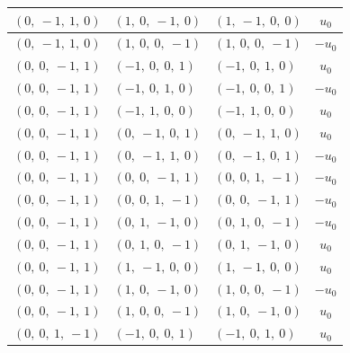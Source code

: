 \documentclass[11pt]{article}
\theoremstyle{definition}
\begin{document}
\begin{longtable}{|l|l|l|c|}
    \hline
    $\left( 0, \  -1, \  1, \  0\right)$ & $\left( 1, \  0, \  -1, \  0\right)$ & $\left( 1, \  -1, \  0, \  0\right)$ & $u_{0}$ \\
    \hline
    $\left( 0, \  -1, \  1, \  0\right)$ & $\left( 1, \  0, \  0, \  -1\right)$ & $\left( 1, \  0, \  0, \  -1\right)$ & $- u_{0}$ \\
    \hline
    $\left( 0, \  0, \  -1, \  1\right)$ & $\left( -1, \  0, \  0, \  1\right)$ & $\left( -1, \  0, \  1, \  0\right)$ & $u_{0}$ \\
    \hline
    $\left( 0, \  0, \  -1, \  1\right)$ & $\left( -1, \  0, \  1, \  0\right)$ & $\left( -1, \  0, \  0, \  1\right)$ & $- u_{0}$ \\
    \hline
    $\left( 0, \  0, \  -1, \  1\right)$ & $\left( -1, \  1, \  0, \  0\right)$ & $\left( -1, \  1, \  0, \  0\right)$ & $u_{0}$ \\
    \hline
    $\left( 0, \  0, \  -1, \  1\right)$ & $\left( 0, \  -1, \  0, \  1\right)$ & $\left( 0, \  -1, \  1, \  0\right)$ & $u_{0}$ \\
    \hline
    $\left( 0, \  0, \  -1, \  1\right)$ & $\left( 0, \  -1, \  1, \  0\right)$ & $\left( 0, \  -1, \  0, \  1\right)$ & $- u_{0}$ \\
    \hline
    $\left( 0, \  0, \  -1, \  1\right)$ & $\left( 0, \  0, \  -1, \  1\right)$ & $\left( 0, \  0, \  1, \  -1\right)$ & $- u_{0}$ \\
    \hline
    $\left( 0, \  0, \  -1, \  1\right)$ & $\left( 0, \  0, \  1, \  -1\right)$ & $\left( 0, \  0, \  -1, \  1\right)$ & $- u_{0}$ \\
    \hline
    $\left( 0, \  0, \  -1, \  1\right)$ & $\left( 0, \  1, \  -1, \  0\right)$ & $\left( 0, \  1, \  0, \  -1\right)$ & $- u_{0}$ \\
    \hline
    $\left( 0, \  0, \  -1, \  1\right)$ & $\left( 0, \  1, \  0, \  -1\right)$ & $\left( 0, \  1, \  -1, \  0\right)$ & $u_{0}$ \\
    \hline
    $\left( 0, \  0, \  -1, \  1\right)$ & $\left( 1, \  -1, \  0, \  0\right)$ & $\left( 1, \  -1, \  0, \  0\right)$ & $u_{0}$ \\
    \hline
    $\left( 0, \  0, \  -1, \  1\right)$ & $\left( 1, \  0, \  -1, \  0\right)$ & $\left( 1, \  0, \  0, \  -1\right)$ & $- u_{0}$ \\
    \hline
    $\left( 0, \  0, \  -1, \  1\right)$ & $\left( 1, \  0, \  0, \  -1\right)$ & $\left( 1, \  0, \  -1, \  0\right)$ & $u_{0}$ \\
    \hline
    $\left( 0, \  0, \  1, \  -1\right)$ & $\left( -1, \  0, \  0, \  1\right)$ & $\left( -1, \  0, \  1, \  0\right)$ & $u_{0}$ \\

\end{longtable}
\end{document}
